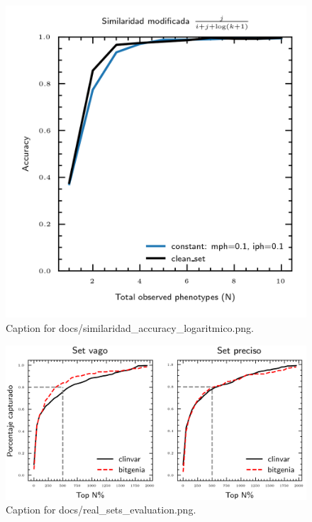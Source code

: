 \documentclass{article}
\begin{document}
\begin{figure}[h] \centering \includegraphics{docs/similaridad_accuracy_logaritmico.png} \caption{Caption for docs/similaridad_accuracy_logaritmico.png.} \end{figure}
\begin{figure}[h] \centering \includegraphics{docs/real_sets_evaluation.png} \caption{Caption for docs/real_sets_evaluation.png.} \end{figure}
\end{document}
